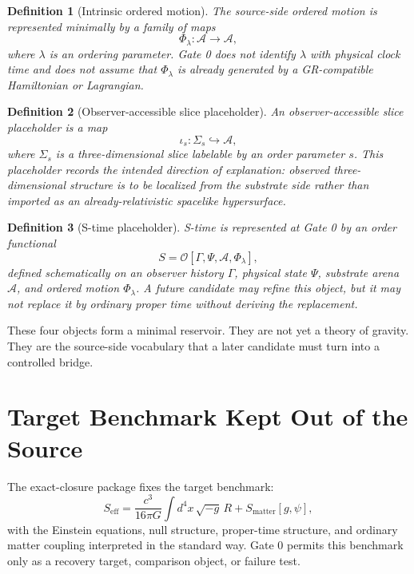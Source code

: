\documentclass[11pt]{article}
\newcommand{\Sub}{\mathcal{A}}
\newcommand{\Order}{\mathcal{O}}
\newtheorem{definition}{Definition}
\begin{document}
\begin{definition}[Intrinsic ordered motion]
The source-side ordered motion is represented minimally by a family of maps
\[
\Phi_{\lambda}:\Sub\to\Sub,
\]
where \(\lambda\) is an ordering parameter. Gate 0 does not identify
\(\lambda\) with physical clock time and does not assume that
\(\Phi_{\lambda}\) is already generated by a GR-compatible Hamiltonian or
Lagrangian.
\end{definition}

\begin{definition}[Observer-accessible slice placeholder]
An observer-accessible slice placeholder is a map
\[
\iota_s:\Sigma_s\hookrightarrow\Sub,
\]
where \(\Sigma_s\) is a three-dimensional slice labelable by an order
parameter \(s\). This placeholder records the intended direction of
explanation: observed three-dimensional structure is to be localized from the
substrate side rather than imported as an already-relativistic spacelike
hypersurface.
\end{definition}

\begin{definition}[S-time placeholder]
S-time is represented at Gate 0 by an order functional
\[
S=\Order[\Gamma,\Psi,\Sub,\Phi_{\lambda}],
\]
defined schematically on an observer history \(\Gamma\), physical state
\(\Psi\), substrate arena \(\Sub\), and ordered motion
\(\Phi_{\lambda}\). A future candidate may refine this object, but it may not
replace it by ordinary proper time without deriving the replacement.
\end{definition}

These four objects form a minimal reservoir. They are not yet a theory of
gravity. They are the source-side vocabulary that a later candidate must turn
into a controlled bridge.

\section{Target Benchmark Kept Out of the Source}

The exact-closure package fixes the target benchmark:
\[
S_{\mathrm{eff}}
=
\frac{c^3}{16\pi G}\int d^4x\,\sqrt{-g}\,R
+
S_{\mathrm{matter}}[g,\psi],
\]
with the Einstein equations, null structure, proper-time structure, and
ordinary matter coupling interpreted in the standard way. Gate 0 permits this
benchmark only as a recovery target, comparison object, or failure test.
\end{document}
